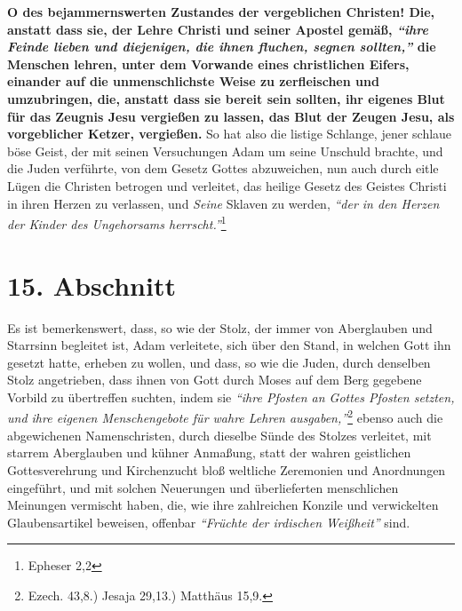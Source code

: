\label{ref:07_14_ketzer}
\textbf{O des bejammernswerten Zustandes der vergeblichen Christen! Die, anstatt
dass
sie, der Lehre Christi und seiner Apostel gemäß,
\textit{"`ihre Feinde lieben und
diejenigen, die ihnen fluchen, segnen sollten,"'}
die Menschen lehren, unter dem
Vorwande eines christlichen Eifers, einander auf die unmenschlichste Weise zu
zerfleischen und umzubringen, die, anstatt
dass sie bereit sein sollten, ihr
eigenes Blut für das Zeugnis Jesu vergießen zu lassen, das Blut der Zeugen Jesu,
als vorgeblicher Ketzer, vergießen.} So hat also die
listige Schlange, jener
schlaue böse Geist, der mit seinen Versuchungen Adam um
seine Unschuld
brachte, und die Juden verführte, von dem Gesetz
Gottes abzuweichen, nun
auch durch eitle Lügen die Christen betrogen und
verleitet, das heilige
Gesetz des Geistes Christi in ihren Herzen zu
verlassen, und \textit{Seine}
Sklaven zu werden,
\textit{"`der in den Herzen der Kinder des Ungehorsams
herrscht."'}\footnote{Epheser 2,2}

\section{15. Abschnitt} \label{kap7_ab15}

Es ist bemerkenswert, dass, so wie der Stolz, der immer von
Aberglauben und
Starrsinn begleitet ist, Adam verleitete,
sich über den Stand, in welchen
Gott ihn gesetzt hatte, erheben zu wollen, und dass, so wie die
Juden, durch
denselben Stolz angetrieben, dass ihnen von Gott durch
Moses auf dem Berg
gegebene Vorbild zu übertreffen suchten, indem sie
\textit{"`ihre Pfosten an Gottes
Pfosten setzten, und ihre eigenen Menschengebote für wahre Lehren
ausgaben,"'}\footnote{Ezech. 43,8.) Jesaja 29,13.) Matthäus 15,9.}
ebenso auch die
abgewichenen Namenschristen, durch dieselbe
Sünde
des Stolzes verleitet, mit
starrem Aberglauben und kühner Anmaßung, statt
der wahren geistlichen
Gottesverehrung und Kirchenzucht
bloß weltliche Zeremonien und Anordnungen
eingeführt, und mit solchen Neuerungen und überlieferten menschlichen Meinungen
vermischt haben, die, wie ihre zahlreichen Konzile  und
verwickelten
Glaubensartikel beweisen, offenbar
\textit{"`Früchte der irdischen Weißheit"'} sind.

